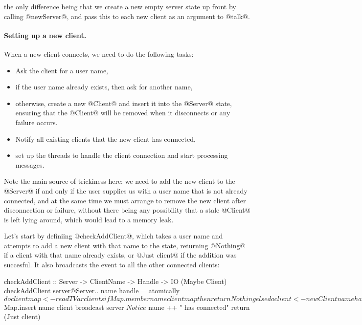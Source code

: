 \noindent the only difference being that we create a new empty server
state up front by calling @newServer@, and pass this to each new
client as an argument to @talk@.

\paragraph{Setting up a new client.} When a new client connects, we
need to do the following tasks:

\begin{itemize}
\item Ask the client for a user name,
\item if the user name already exists, then ask for another name,
\item otherwise, create a new @Client@ and insert it into the @Server@
  state, ensuring that the @Client@ will be removed when it
  disconnects or any failure occurs.
\item Notify all existing clients that the new client has connected,
\item set up the threads to handle the client connection and start
  processing messages.
\end{itemize}

Note the main source of trickiness here: we need to add the new client
to the @Server@ if and only if the user supplies us with a user name
that is not already connected, and at the same time we must arrange to
remove the new client after disconnection or failure, without there
being any possibility that a stale @Client@ is left lying around,
which would lead to a memory leak.

Let's start by definiing @checkAddClient@, which takes a user name and
attempts to add a new client with that name to the state, returning
@Nothing@ if a client with that name already exists, or @Just client@
if the addition was succesful.  It also broadcasts the event to all
the other connected clients:

\begin{haskell}
checkAddClient :: Server -> ClientName -> Handle -> IO (Maybe Client)
checkAddClient server@Server{..} name handle = atomically $ do
    clientmap <- readTVar clients
    if Map.member name clientmap
       then return Nothing
       else do client <- newClient name handle
               modifyTVar' clients $ Map.insert name client
               broadcast server $ Notice $ name ++ " has connected"
               return (Just client)
\end{haskell}


